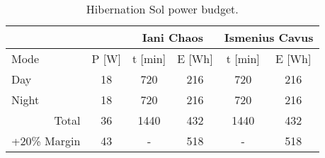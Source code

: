 \begin{table}[h]
  \footnotesize
  \centering
  \caption{Hibernation Sol power budget.}
  \label{tab:hibernation-sol-power-budget}
  \begin{tabular}{lc|c|c|c|c|}
    \cline{3-6}
     & & \multicolumn{2}{c|}{Iani Chaos} & \multicolumn{2}{c|}{Ismenius Cavus} \\ \hline
    \multicolumn{1}{|l|}{Mode} & P {[}W{]} & t {[}min{]} & E {[}Wh{]} & t {[}min{]} & E {[}Wh{]} \\ \hline
    \multicolumn{1}{|l|}{Day} & 18 & 720 & 216 & 720 & 216 \\ \hline
    \multicolumn{1}{|l|}{Night} & 18 & 720 & 216 & 720 & 216 \\ \hline
    \multicolumn{1}{|r|}{Total} & 36 & 1440 & 432 & 1440 & 432 \\ \hline
    \multicolumn{1}{|r|}{+20\% Margin} & 43 & - & 518 & - & 518 \\ \hline
  \end{tabular}
\end{table}
